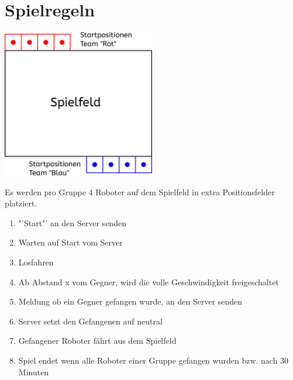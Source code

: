 \section{Spielregeln}
\begin{center}
	\includegraphics[width=0.5\textwidth]{Bilder/Spielfeld.pdf}
\end{center}
Es werden pro Gruppe 4 Roboter auf dem Spielfeld in extra Positionsfelder platziert.

\begin{enumerate}
	\item "'Start"' an den Server senden
	\item Warten auf Start vom Server
	\item Losfahren
	\item Ab Abstand x vom Gegner, wird die volle Geschwindigkeit freigeschaltet
	\item Meldung ob ein Gegner gefangen wurde, an den Server senden
	\item Server setzt den Gefangenen auf neutral
	\item Gefangener Roboter fährt aus dem Spielfeld
	\item Spiel endet wenn alle Roboter einer Gruppe gefangen wurden bzw. nach 30 Minuten
\end{enumerate}